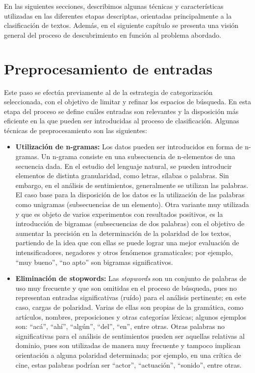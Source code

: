 {\begin{itemize}
\end{itemize}

En las siguientes secciones, describimos algunas t\'ecnicas y caracter\'isticas utilizadas en las diferentes etapas descriptas, orientadas principalmente a la clasificaci\'on de textos. Adem\'as, en  el siguiente cap\'itulo se presenta una visi\'on general del proceso de descubrimiento en funci\'on al problema abordado.

\section{Preprocesamiento de entradas}

Este paso se efect\'ua previamente al de la estrategia de categorizaci\'on seleccionada, con el objetivo de limitar y refinar los espacios de b\'usqueda. En esta etapa del proceso se define cu\'ales entradas son relevantes y la disposici\'on m\'as eficiente en la que pueden ser introducidas al proceso de clasificaci\'on. Algunas t\'ecnicas de preprocesamiento son las siguientes:

\begin{itemize}

\item \textbf{Utilizaci\'on de n-gramas:} Los datos pueden ser introducidos en forma de n-gramas. Un n-grama consiste en una subsecuencia de n-elementos de una secuencia dada. En el estudio del lenguaje natural, se pueden introducir elementos de distinta granularidad, como letras, s\'ilabas o palabras. Sin embargo, en el an\'alisis de sentimientos, generalmente se utilizan las palabras. El caso base para la disposici\'on de los datos es la utilizaci\'on de las palabras como unigramas (subsecuencias de un elemento). Otra variante muy utilizada y que es objeto de varios experimentos con resultados positivos, es la introducci\'on de bigramas (subsecuencias de dos palabras) con el objetivo de aumentar la precisi\'on en la determinaci\'on de la polaridad de los textos, partiendo de la idea que con ellas se puede lograr una mejor evaluaci\'on de intensificadores, negadores y otros fen\'omenos gramaticales; por ejemplo, ``muy bueno'', ``no apto'' son bigramas significativos.

\item \textbf{Eliminaci\'on de stopwords:} Las \textit{stopwords} son un conjunto de palabras de uso muy frecuente y que son omitidas en el proceso de b\'usqueda, pues no representan entradas significativas (ru\'ido) para el an\'alisis pertinente; en este caso, cargas de polaridad. Varias de ellas son propias de la gram\'atica, como art\'iculos, nombres, preposiciones y otras categor\'ias l\'exicas; algunos ejemplos son: ``ac\'a'', ``ah\'i'', ``alg\'un'', ``del'', ``en'', entre otras. Otras palabras no significativas para el an\'alisis de sentimientos pueden ser aquellas relativas al dominio, pues son utilizadas de manera muy frecuente y tampoco implican orientaci\'on a alguna polaridad determinada; por ejemplo, en una cr\'itica de cine, estas palabras podr\'ian ser ``actor'', ``actuaci\'on'', ``sonido'', entre otras.


\end{itemize}}

